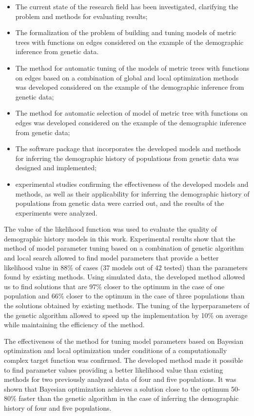\begin{itemize}
    \item The current state of the research field has been investigated, clarifying the problem and methods for evaluating results;
    \item The formalization of the problem of building and tuning models of metric trees with functions on edges considered on the example of the demographic inference from genetic data.
    \item The method for automatic tuning of the models of metric trees with functions on edges based on a combination of global and local optimization methods was developed considered on the example of the demographic inference from genetic data;
    \item The method for automatic selection of model of metric tree with functions on edges was developed considered on the example of the demographic inference from genetic data;
    \item The software package that incorporates the developed models and methods for inferring the demographic history of populations from genetic data was designed and implemented;
    \item experimental studies confirming the effectiveness of the developed models and methods, as well as their applicability for inferring the demographic history of populations from genetic data were carried out, and the results of the experiments were analyzed.\\
\end{itemize}

The value of the likelihood function was used to evaluate the quality of demographic history models in this work.
Experimental results show that the method of model parameter tuning based on a combination of genetic algorithm and local search allowed to find model parameters that provide a better likelihood value in 88\% of cases (37 models out of 42 tested) than the parameters found by existing methods.
Using simulated data, the developed method allowed us to find solutions that are 97\% closer to the optimum in the case of one population and 66\% closer to the optimum in the case of three populations than the solutions obtained by existing methods.
The tuning of the hyperparameters of the genetic algorithm allowed to speed up the implementation by 10\% on average while maintaining the efficiency of the method.

The effectiveness of the method for tuning model parameters based on Bayesian optimization and local optimization under conditions of a computationally complex target function was confirmed.
The developed method made it possible to find parameter values providing a better likelihood value than existing methods for two previously analyzed data of four and five populations.
It was shown that Bayesian optimization achieves a solution close to the optimum 50-80\% faster than the genetic algorithm in the case of inferring the demographic history of four and five populations.

